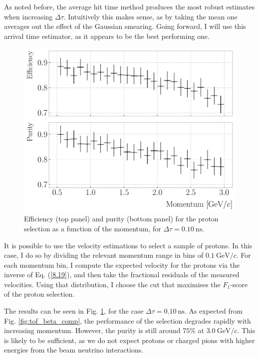 As noted before, the average hit time method produces the most robust estimates when increasing $\Delta \tau$. Intuitively this makes sense, as by taking the mean one averages out the effect of the Gaussian smearing. Going forward, I will use this arrival time estimator, as it appears to be the best performing one.

\begin{figure}[t]
	\centering
	\includegraphics[width=.75\linewidth]{Images/GArSoft_PID/tof/proton_selection_beta_metrics.pdf}
	\caption{Efficiency (top panel) and purity (bottom panel) for the proton selection as a function of the momentum, for $\Delta \tau = 0.10 ~ \mathrm{ns}$.}
	\label{fig:tof_beta_selection}
\end{figure}

It is possible to use the velocity estimations to select a sample of protons. In this case, I do so by dividing the relevant momentum range in bins of $0.1~\mathrm{GeV}/c$. For each momentum bin, I compute the expected velocity for the protons via the inverse of Eq. (\ref{8.19}), and then take the fractional residuals of the measured velocities. Using that distribution, I choose the cut that maximises the $F_{1}$-score of the proton selection.

The results can be seen in Fig. \ref{fig:tof_beta_selection}, for the case $\Delta \tau = 0.10 ~ \mathrm{ns}$. As expected from Fig. \ref{fig:tof_beta_comp}, the performance of the selection degrades rapidly with increasing momentum. However, the purity is still around $75\%$ at $3.0~\mathrm{GeV}/c$. This is likely to be sufficient, as we do not expect protons or charged pions with higher energies from the beam neutrino interactions.

